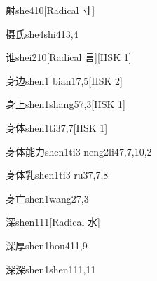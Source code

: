 \begin{entry}{射}{she4}{10}[Radical 寸]
\end{entry}

\begin{entry}{摄氏}{she4shi4}{13,4}
\end{entry}

\begin{entry}{谁}{shei2}{10}[Radical 言][HSK 1]
\end{entry}

\begin{entry}{身边}{shen1 bian1}{7,5}[HSK 2]
\end{entry}

\begin{entry}{身上}{shen1shang5}{7,3}[HSK 1]
\end{entry}

\begin{entry}{身体}{shen1ti3}{7,7}[HSK 1]
\end{entry}

\begin{entry}{身体能力}{shen1ti3 neng2li4}{7,7,10,2}
\end{entry}

\begin{entry}{身体乳}{shen1ti3 ru3}{7,7,8}
\end{entry}

\begin{entry}{身亡}{shen1wang2}{7,3}
\end{entry}

\begin{entry}{深}{shen1}{11}[Radical 水]
\end{entry}

\begin{entry}{深厚}{shen1hou4}{11,9}
\end{entry}

\begin{entry}{深深}{shen1shen1}{11,11}
\end{entry}

